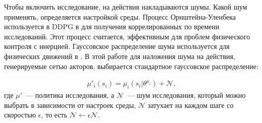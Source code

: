 Чтобы включить исследование, на действия накладываются шумы. Какой шум применять, определяется настройкой среды. Процесс Орнштейна-Уленбека используется в DDPG в \cite{lillicrap2015continuous} для получения коррелированных по времени исследований. Этот процесс считается, эффективным для проблем физического контроля с инерцией. Гауссовское распределение шума используется для физических движений в \cite{mordatch2017emergence}. В этой работе для наложения шума на действия, генерируемые сетью акторов, выбирается стандартное гауссовское распределение:

\begin{equation}
    \begin{multlined}
        \mu'_i(s_i) = \mu_i(s_i|\theta^{\mu_i}) + \mathcal{N},
    \end{multlined}
\end{equation}
где $\mu'$~--- политика исследования, а $\mathcal{N}$~--- шум исследования, который можно выбрать в зависимости от настроек среды, $\mathcal{N}$ затухает на каждом шаге со скоростью $\epsilon$, то есть $\mathcal{N} \leftarrow \epsilon \mathcal{N}$.
